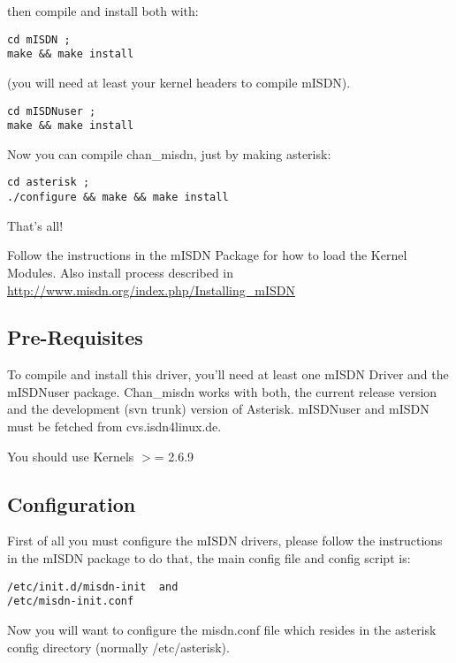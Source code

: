 then compile and install both with:
\begin{astlisting}
\begin{verbatim}
cd mISDN ;
make && make install
\end{verbatim}
\end{astlisting}
(you will need at least your kernel headers to compile mISDN).
\begin{astlisting}
\begin{verbatim}
cd mISDNuser ;
make && make install
\end{verbatim}
\end{astlisting}
Now you can compile chan\_misdn, just by making asterisk:
\begin{astlisting}
\begin{verbatim}
cd asterisk ;
./configure && make && make install
\end{verbatim}
\end{astlisting}
That's all!

Follow the instructions in the mISDN Package for how to load the Kernel
Modules. Also install process described in \url{http://www.misdn.org/index.php/Installing_mISDN}

\subsection{Pre-Requisites}

To compile and install this driver, you'll need at least one mISDN Driver and
the mISDNuser package. Chan\_misdn works with both, the current release version
and the development (svn trunk) version of Asterisk. mISDNuser and mISDN must
be fetched from cvs.isdn4linux.de.

You should use Kernels $>$= 2.6.9


\subsection{Configuration}

First of all you must configure the mISDN drivers, please follow the
instructions in the mISDN package to do that, the main config file and config
script is:
\begin{astlisting}
\begin{verbatim}
/etc/init.d/misdn-init  and
/etc/misdn-init.conf
\end{verbatim}
\end{astlisting}
Now you will want to configure the misdn.conf file which resides in the
asterisk config directory (normally /etc/asterisk).

